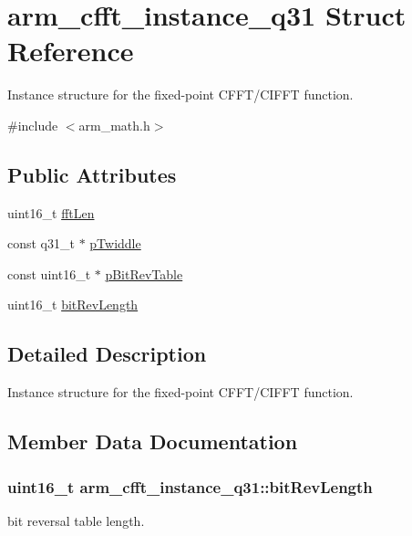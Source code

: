 \hypertarget{structarm__cfft__instance__q31}{}\section{arm\+\_\+cfft\+\_\+instance\+\_\+q31 Struct Reference}
\label{structarm__cfft__instance__q31}


Instance structure for the fixed-\/point C\+F\+F\+T/\+C\+I\+F\+FT function.  




{\ttfamily \#include $<$arm\+\_\+math.\+h$>$}

\subsection*{Public Attributes}
\begin{DoxyCompactItemize}
\item 
uint16\+\_\+t \hyperlink{structarm__cfft__instance__q31_a4406f23e8fd0bff8d555225612e2a2a8}{fft\+Len}
\item 
const q31\+\_\+t $\ast$ \hyperlink{structarm__cfft__instance__q31_af751114feb91de3ace8600e91bdd0872}{p\+Twiddle}
\item 
const uint16\+\_\+t $\ast$ \hyperlink{structarm__cfft__instance__q31_a8a464461649f023325ced1e10470f5d0}{p\+Bit\+Rev\+Table}
\item 
uint16\+\_\+t \hyperlink{structarm__cfft__instance__q31_a2250fa6b8fe73292c5418c50c0549f87}{bit\+Rev\+Length}
\end{DoxyCompactItemize}


\subsection{Detailed Description}
Instance structure for the fixed-\/point C\+F\+F\+T/\+C\+I\+F\+FT function. 

\subsection{Member Data Documentation}
\subsubsection[{\texorpdfstring{bit\+Rev\+Length}{bitRevLength}}]{\setlength{\rightskip}{0pt plus 5cm}uint16\+\_\+t arm\+\_\+cfft\+\_\+instance\+\_\+q31\+::bit\+Rev\+Length}\hypertarget{structarm__cfft__instance__q31_a2250fa6b8fe73292c5418c50c0549f87}{}\label{structarm__cfft__instance__q31_a2250fa6b8fe73292c5418c50c0549f87}
bit reversal table length. 
